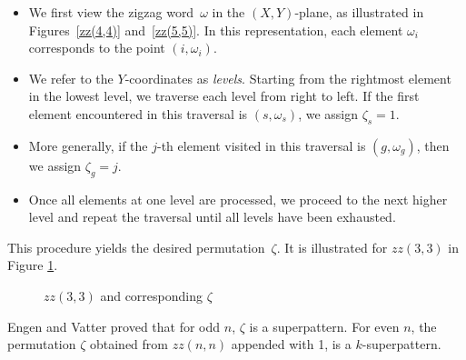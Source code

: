 \documentclass[a4paper,12pt]{article}
\theoremstyle{definition}
\numberwithin{equation}{section}
\begin{document}
\begin{itemize}
    \item We first view the zigzag word~$\omega$ in the $(X,Y)$-plane, as illustrated in Figures~\ref{zz(4,4)} and~\ref{zz(5,5)}. 
    In this representation, each element $\omega_i$ corresponds to the point $(i, \omega_i)$.
    
    \item We refer to the $Y$-coordinates as \emph{levels}. 
    Starting from the rightmost element in the lowest level, we traverse each level from right to left. 
    If the first element encountered in this traversal is $(s, \omega_s)$, we assign $\zeta_s = 1$.
    
    \item More generally, if the $j$-th element visited in this traversal is $(g, \omega_g)$, then we assign $\zeta_g = j$.
    
    \item Once all elements at one level are processed, we proceed to the next higher level and repeat the traversal until all levels have been exhausted.
\end{itemize}


This procedure yields the desired permutation~$\zeta$. It is illustrated for $zz(3,3)$ in Figure \ref{wtoperm}. 

\begin{figure}[h!]

\begin{center}
\hspace{1cm}
\raisebox{6em}{$\Longrightarrow$} %
\hspace{1cm}
\end{center}

    \caption{$zz(3,3)$ and corresponding $\zeta$}
    \label{wtoperm}
\end{figure}
Engen and Vatter proved that for odd $n$, $\zeta$ is a superpattern. For even $n$, the permutation $\zeta$ obtained from $zz(n,n)$ appended with 1, is a $k$-superpattern. 
\end{document}
